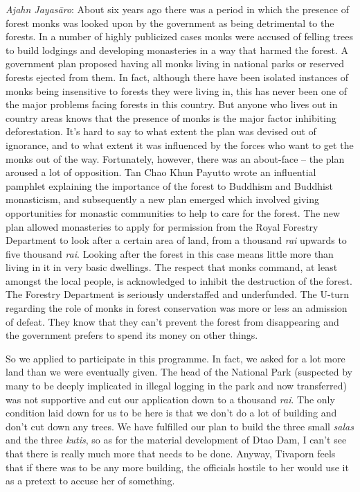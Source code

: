 \emph{Ajahn Jayasāro}: About six years ago there was a period in which
the presence of forest monks was looked upon by the government as being
detrimental to the forests. In a number of highly publicized cases monks
were accused of felling trees to build lodgings and developing
monasteries in a way that harmed the forest. A government plan proposed
having all monks living in national parks or reserved forests ejected
from them. In fact, although there have been isolated instances of monks
being insensitive to forests they were living in, this has never been
one of the major problems facing forests in this country. But anyone who
lives out in country areas knows that the presence of monks is the major
factor inhibiting deforestation. It's hard to say to what extent the
plan was devised out of ignorance, and to what extent it was influenced
by the forces who want to get the monks out of the way. Fortunately, 
however, there was an about-face -- the plan aroused a lot of
opposition. Tan Chao Khun Payutto wrote an influential pamphlet
explaining the importance of the forest to Buddhism and Buddhist
monasticism, and subsequently a new plan emerged which involved giving
opportunities for monastic communities to help to care for the forest. 
The new plan allowed monasteries to apply for permission from the Royal
Forestry Department to look after a certain area of land, from a
thousand \emph{rai} upwards to five thousand \emph{rai}. Looking after
the forest in this case means little more than living in it in very
basic dwellings. The respect that monks command, at least amongst the
local people, is acknowledged to inhibit the destruction of the forest. 
The Forestry Department is seriously understaffed and underfunded. The
U-turn regarding the role of monks in forest conservation was more or
less an admission of defeat. They know that they can't prevent the
forest from disappearing and the government prefers to spend its money
on other things. 

So we applied to participate in this programme. In fact, we asked for a
lot more land than we were eventually given. The head of the National
Park (suspected by many to be deeply implicated in illegal logging in
the park and now transferred) was not supportive and cut our application
down to a thousand \emph{rai}. The only condition laid down for us to be
here is that we don't do a lot of building and don't cut down any trees. 
We have fulfilled our plan to build the three small \emph{salas} and the
three \emph{kutis}, so as for the material development of Dtao Dam, I
can't see that there is really much more that needs to be done. Anyway, 
Tivaporn feels that if there was to be any more building, the officials
hostile to her would use it as a pretext to accuse her of something. 

